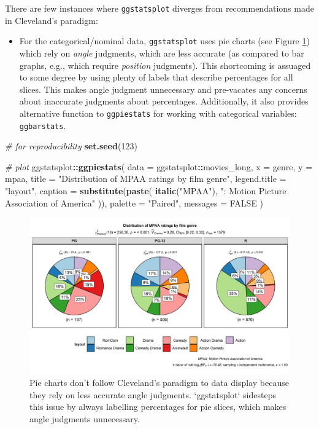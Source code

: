 \documentclass[
]{article}
\newenvironment{Shaded}{\begin{snugshade}}{\end{snugshade}}
\newcommand{\CommentTok}[1]{\textcolor[rgb]{0.56,0.35,0.01}{\textit{#1}}}
\newcommand{\DataTypeTok}[1]{\textcolor[rgb]{0.13,0.29,0.53}{#1}}
\newcommand{\DecValTok}[1]{\textcolor[rgb]{0.00,0.00,0.81}{#1}}
\newcommand{\KeywordTok}[1]{\textcolor[rgb]{0.13,0.29,0.53}{\textbf{#1}}}
\newcommand{\NormalTok}[1]{#1}
\newcommand{\OperatorTok}[1]{\textcolor[rgb]{0.81,0.36,0.00}{\textbf{#1}}}
\newcommand{\OtherTok}[1]{\textcolor[rgb]{0.56,0.35,0.01}{#1}}
\newcommand{\StringTok}[1]{\textcolor[rgb]{0.31,0.60,0.02}{#1}}
\providecommand{\tightlist}{%
  \setlength{\itemsep}{0pt}\setlength{\parskip}{0pt}}
\begin{document}
There are few instances where \texttt{ggstatsplot} diverges from recommendations made
in Cleveland's paradigm:

\begin{itemize}
\tightlist
\item
  For the categorical/nominal data, \texttt{ggstatsplot} uses pie charts (see Figure
  \ref{fig:fig2}) which rely on \emph{angle} judgments, which are less accurate (as
  compared to bar graphs, e.g., which require \emph{position} judgments). This
  shortcoming is assuaged to some degree by using plenty of labels that
  describe percentages for all slices. This makes angle judgment unnecessary
  and pre-vacates any concerns about inaccurate judgments about percentages.
  Additionally, it also provides alternative function to \texttt{ggpiestats} for
  working with categorical variables: \texttt{ggbarstats}.
\end{itemize}

\begin{Shaded}
\begin{Highlighting}[]
\CommentTok{\# for reproducibility}
\KeywordTok{set.seed}\NormalTok{(}\DecValTok{123}\NormalTok{)}

\CommentTok{\# plot}
\NormalTok{ggstatsplot}\OperatorTok{::}\KeywordTok{ggpiestats}\NormalTok{(}
  \DataTypeTok{data =}\NormalTok{ ggstatsplot}\OperatorTok{::}\NormalTok{movies\_long,}
  \DataTypeTok{x =}\NormalTok{ genre,}
  \DataTypeTok{y =}\NormalTok{ mpaa,}
  \DataTypeTok{title =} \StringTok{"Distribution of MPAA ratings by film genre"}\NormalTok{,}
  \DataTypeTok{legend.title =} \StringTok{"layout"}\NormalTok{,}
  \DataTypeTok{caption =} \KeywordTok{substitute}\NormalTok{(}\KeywordTok{paste}\NormalTok{(}
    \KeywordTok{italic}\NormalTok{(}\StringTok{"MPAA"}\NormalTok{), }\StringTok{": Motion Picture Association of America"}
\NormalTok{  )),}
  \DataTypeTok{palette =} \StringTok{"Paired"}\NormalTok{,}
  \DataTypeTok{messages =} \OtherTok{FALSE}
\NormalTok{)}
\end{Highlighting}
\end{Shaded}

\begin{figure}[H]
\includegraphics[width=1\linewidth]{./figures/paper-fig2-1} \caption{Pie charts don't follow Cleveland's paradigm to data display because they rely on less accurate angle judgments. `ggstatsplot` sidesteps this issue by always labelling percentages for pie slices, which makes angle judgments unnecessary.}\label{fig:fig2}
\end{figure}
\end{document}
